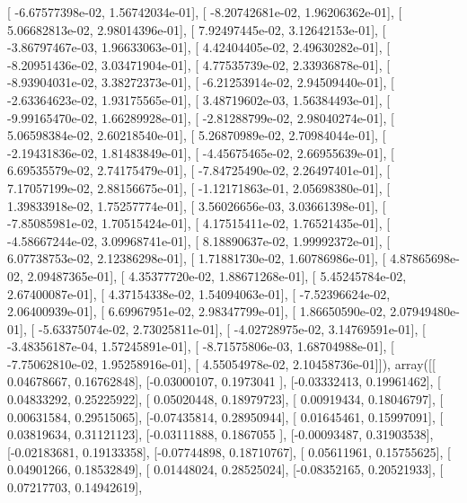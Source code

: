 \documentclass{article}
\begin{document}
       [ -6.67577398e-02,   1.56742034e-01],
       [ -8.20742681e-02,   1.96206362e-01],
       [  5.06682813e-02,   2.98014396e-01],
       [  7.92497445e-02,   3.12642153e-01],
       [ -3.86797467e-03,   1.96633063e-01],
       [  4.42404405e-02,   2.49630282e-01],
       [ -8.20951436e-02,   3.03471904e-01],
       [  4.77535739e-02,   2.33936878e-01],
       [ -8.93904031e-02,   3.38272373e-01],
       [ -6.21253914e-02,   2.94509440e-01],
       [ -2.63364623e-02,   1.93175565e-01],
       [  3.48719602e-03,   1.56384493e-01],
       [ -9.99165470e-02,   1.66289928e-01],
       [ -2.81288799e-02,   2.98040274e-01],
       [  5.06598384e-02,   2.60218540e-01],
       [  5.26870989e-02,   2.70984044e-01],
       [ -2.19431836e-02,   1.81483849e-01],
       [ -4.45675465e-02,   2.66955639e-01],
       [  6.69535579e-02,   2.74175479e-01],
       [ -7.84725490e-02,   2.26497401e-01],
       [  7.17057199e-02,   2.88156675e-01],
       [ -1.12171863e-01,   2.05698380e-01],
       [  1.39833918e-02,   1.75257774e-01],
       [  3.56026656e-03,   3.03661398e-01],
       [ -7.85085981e-02,   1.70515424e-01],
       [  4.17515411e-02,   1.76521435e-01],
       [ -4.58667244e-02,   3.09968741e-01],
       [  8.18890637e-02,   1.99992372e-01],
       [  6.07738753e-02,   2.12386298e-01],
       [  1.71881730e-02,   1.60786986e-01],
       [  4.87865698e-02,   2.09487365e-01],
       [  4.35377720e-02,   1.88671268e-01],
       [  5.45245784e-02,   2.67400087e-01],
       [  4.37154338e-02,   1.54094063e-01],
       [ -7.52396624e-02,   2.06400939e-01],
       [  6.69967951e-02,   2.98347799e-01],
       [  1.86650590e-02,   2.07949480e-01],
       [ -5.63375074e-02,   2.73025811e-01],
       [ -4.02728975e-02,   3.14769591e-01],
       [ -3.48356187e-04,   1.57245891e-01],
       [ -8.71575806e-03,   1.68704988e-01],
       [ -7.75062810e-02,   1.95258916e-01],
       [  4.55054978e-02,   2.10458736e-01]]), array([[ 0.04678667,  0.16762848],
       [-0.03000107,  0.1973041 ],
       [-0.03332413,  0.19961462],
       [ 0.04833292,  0.25225922],
       [ 0.05020448,  0.18979723],
       [ 0.00919434,  0.18046797],
       [ 0.00631584,  0.29515065],
       [-0.07435814,  0.28950944],
       [ 0.01645461,  0.15997091],
       [ 0.03819634,  0.31121123],
       [-0.03111888,  0.1867055 ],
       [-0.00093487,  0.31903538],
       [-0.02183681,  0.19133358],
       [-0.07744898,  0.18710767],
       [ 0.05611961,  0.15755625],
       [ 0.04901266,  0.18532849],
       [ 0.01448024,  0.28525024],
       [-0.08352165,  0.20521933],
       [ 0.07217703,  0.14942619],
\end{document}
